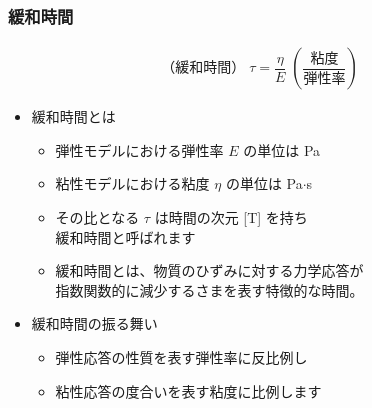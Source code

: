 \documentclass[12pt, dvipdfmx]{beamer}
\begin{document}
\begin{frame}
	\frametitle{緩和時間}
		\begin{align*}
			\text{（緩和時間）}\;\tau = \dfrac{\eta}{E}\; \left( \dfrac{\text{粘度}}{\text{弾性率}} \right)
		\end{align*}
		\vspace{-3mm}
		\begin{itemize}
			\item 緩和時間とは
			\begin{itemize}
				\item 弾性モデルにおける弾性率 $E$ の単位は Pa
				\item 粘性モデルにおける粘度 $\eta$ の単位は Pa$\cdot$s
				\item \alert{その比となる $\tau$ は時間の次元 [T] を持ち\\緩和時間}と呼ばれます
				\item 緩和時間とは、物質のひずみに対する力学応答が\\指数関数的に減少するさまを表す特徴的な時間。
			\end{itemize}
			\item 緩和時間の振る舞い
			\begin{itemize}
				\item 弾性応答の性質を表す\alert{弾性率に反比例}し
				\item 粘性応答の度合いを表す\alert{粘度に比例}します
			\end{itemize}
		\end{itemize}
\end{frame}
\end{document}
